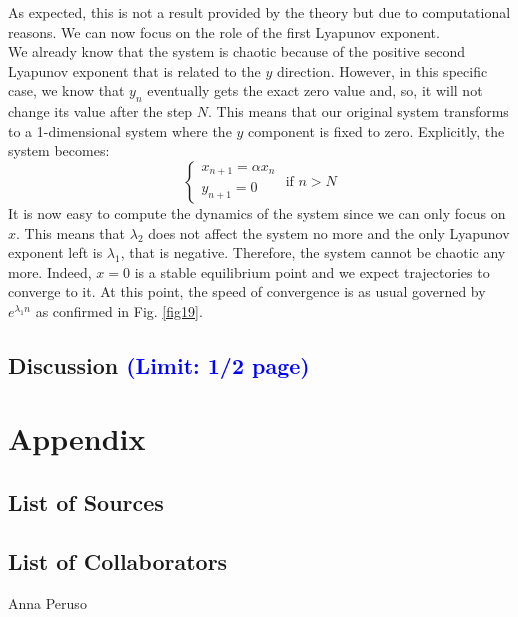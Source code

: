 \documentclass[11pt,titlepage]{article}
\begin{document}
As expected, this is not a result provided by the theory but due to computational reasons. We can now focus on the role of the first Lyapunov exponent. \\
We already know that the system is chaotic because of the positive second Lyapunov exponent that is related to the $y$ direction. However, in this specific case, we know that $y_n$ eventually gets the exact zero value and, so, it will not change its value after the step $N$. This means that our original system transforms to a 1-dimensional system where the $y$ component is fixed to zero. Explicitly, the system becomes:
\begin{equation*}
	\begin{cases}
		x_{n+1} = \alpha x_n \\
		y_{n+1} = 0
	\end{cases}
 	\text{ if } n > N
\end{equation*}
It is now easy to compute the dynamics of the system since we can only focus on $x$.  This means that $\lambda_2$ does not affect the system no more and the only Lyapunov exponent left is $\lambda_1$, that is negative. Therefore, the system cannot be chaotic any more. Indeed, $x=0$ is a stable equilibrium point and we expect trajectories to converge to it. At this point, the speed of convergence is as usual governed by $e^{\lambda_1 n}$ as confirmed in Fig. \ref{fig19}.



\subsection{Discussion \textcolor{blue}{(Limit: 1/2 page)}} %





\clearpage
\appendix
\section*{Appendix}
\subsection*{List of Sources}

\subsection*{List of Collaborators}
Anna Peruso

\end{document}
